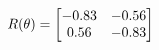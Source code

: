 \documentclass[preview]{standalone}
\begin{document}
\begin{align*}
\special{dvisvgm:raw <g id='unique000'>}R(\theta) = \begin{bmatrix}-0.83 & -0.56\\0.56 & -0.83\end{bmatrix}\special{dvisvgm:raw </g>}
\end{align*}
\end{document}
